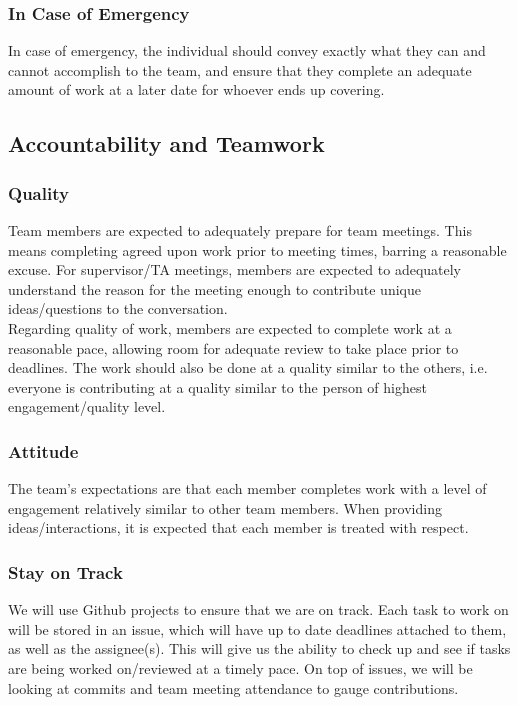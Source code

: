 \documentclass{article}
\begin{document}
\subsubsection*{In Case of Emergency}

In case of emergency, the individual should convey exactly what they can and cannot accomplish to
the team, and ensure that they complete an adequate amount of work at a later date 
for whoever ends up covering.

\subsection*{Accountability and Teamwork}

\subsubsection*{Quality}

Team members are expected to adequately prepare for team meetings. This means completing 
agreed upon work prior to meeting times, barring a reasonable excuse. For supervisor/TA
meetings, members are expected to adequately understand the reason for the meeting enough
to contribute unique ideas/questions to the conversation.\\ 

Regarding quality of work, members are expected to complete work at a reasonable pace, allowing room 
for adequate review to take place prior to deadlines. The work should also be done at a quality
similar to the others, i.e. everyone is contributing at a quality similar to the person of highest
engagement/quality level.

\subsubsection*{Attitude}

The team's expectations are that each member completes work with a level of engagement
relatively similar to other team members. When providing ideas/interactions, it is 
expected that each member is treated with respect.

\subsubsection*{Stay on Track}

We will use Github projects to ensure that we are on track. Each task to work on
will be stored in an issue, which will have up to date deadlines attached to them, 
as well as the assignee(s). This will give us the ability to check up and see if 
tasks are being worked on/reviewed at a timely pace. On top of issues, we will 
be looking at commits and team meeting attendance to gauge contributions.\\
\end{document}
